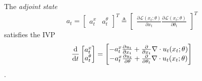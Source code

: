 \documentclass{scrartcl}
\begin{document}
\begin{resultbox}
The \textit{adjoint state} \begin{equation} a_t = \begin{bmatrix}a_t^x & a_t^\theta \end{bmatrix}^T \triangleq \begin{bmatrix} \frac{\partial \mathcal{L}(x_t; \theta)}{\partial x_t } \frac{\partial \mathcal{L}(x_t; \theta)}{\partial \theta_t}\end{bmatrix}^T\end{equation} satisfies the IVP
\begin{equation}
\frac{\d}{\d t} \begin{bmatrix}a_t^x \\ a_t^\theta \end{bmatrix} = \begin{bmatrix} 
    -a_t^x\frac{\partial u_t}{\partial x_t} + \frac{\partial}{\partial x_t} \nabla \cdot u_t(x_t; \theta) \\
    -a_t^x \frac{\partial u_t}{\partial \theta} + \frac{\partial}{\partial \theta_t} \nabla \cdot u_t(x_t; \theta)
\end{bmatrix}
\end{equation}.
\end{resultbox}
\end{document}
